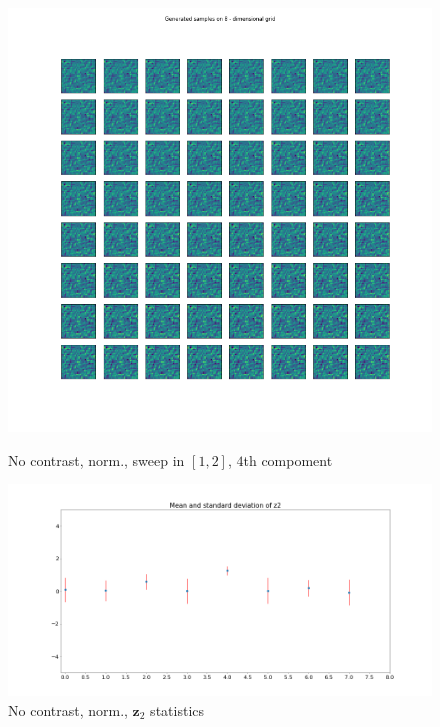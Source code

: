 \documentclass[12pt, english]{article}
\begin{document}
\begin{figure}[H] 
  \label{fig:contrast-correlation} 
  \begin{minipage}[b]{0.4\linewidth}
    \centering
    \includegraphics[width=.8\linewidth]{sweep/norm_no_contrast_sweep_one_to_two_4th_param.png} 
    \caption{No contrast, norm., sweep in $[1, 2]$, $4$th compoment} 
    \label{fig:no-contrast-norm-sweep}
  \end{minipage}%
  \begin{minipage}[b]{0.6\linewidth}
    \centering
    \includegraphics[width=1\linewidth]{sweep/norm_no_contrast_z2_stats.png} 
    \caption{No contrast, norm.,  $\bm{z}_{2}$ statistics} 
    \label{fig:no-contrast-no-norm-stats}
  \end{minipage} 
\end{figure}

\vspace{4mm} 
 
\end{document}
